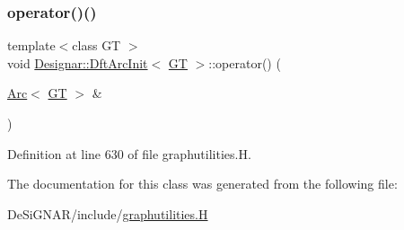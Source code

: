 \subsubsection{\texorpdfstring{operator()()}{operator()()}}
{\footnotesize\ttfamily template$<$class GT $>$ \\
void \hyperlink{class_designar_1_1_dft_arc_init}{Designar\+::\+Dft\+Arc\+Init}$<$ \hyperlink{demo-buildgraph_8_c_a3001c40d2c31ca87ed96cd7d1334a55e}{GT} $>$\+::operator() (\begin{DoxyParamCaption}\item[{\hyperlink{namespace_designar_a3f55fb5513d62ff47cbc8f72b8e95d6f}{Arc}$<$ \hyperlink{demo-buildgraph_8_c_a3001c40d2c31ca87ed96cd7d1334a55e}{GT} $>$ \&}]{ }\end{DoxyParamCaption})\hspace{0.3cm}{\ttfamily [inline]}}



Definition at line 630 of file graphutilities.\+H.



The documentation for this class was generated from the following file\+:\begin{DoxyCompactItemize}
\item 
De\+Si\+G\+N\+A\+R/include/\hyperlink{graphutilities_8_h}{graphutilities.\+H}\end{DoxyCompactItemize}
